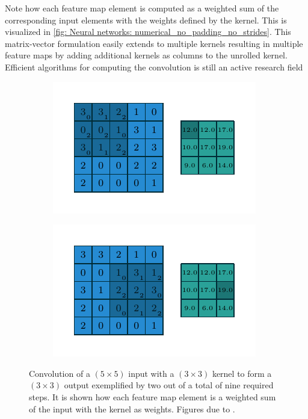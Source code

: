 Note how each feature map element is computed as a weighted sum of the corresponding input elements with the weights defined by the kernel. This is visualized in \autoref{fig: Neural networks: numerical_no_padding_no_strides}. This matrix-vector formulation easily extends to multiple kernels resulting in multiple feature maps by adding additional kernels as columns to the unrolled kernel. Efficient algorithms for computing the convolution is still an active research field \cite{Goodfellow2016}
\begin{figure}[tbp!]
    \begin{subfigure}[b]{0.49\textwidth}
        \centering
        \includegraphics[width=\textwidth]{graphics/neuralnetworks/numerical_no_padding_no_strides_00.pdf}
        \caption{}
        \label{fig: Neural networks: numerical_no_padding_no_strides 1}
    \end{subfigure}
    \hfill
    \begin{subfigure}[b]{0.49\textwidth}
        \centering
        \includegraphics[width=\textwidth]{graphics/neuralnetworks/numerical_no_padding_no_strides_05.pdf}
        \caption{}
        \label{fig: Neural networks: numerical_no_padding_no_strides 2}
    \end{subfigure}
    \caption{Convolution of a $(5\times5)$ input with a $(3\times3)$ kernel to form a $(3\times3)$ output exemplified by two out of a total of nine required steps. It is shown how each feature map element is a weighted sum of the input with the kernel as weights. Figures due to \cite{Dumoulin2018}.}
    \label{fig: Neural networks: numerical_no_padding_no_strides}
\end{figure}

